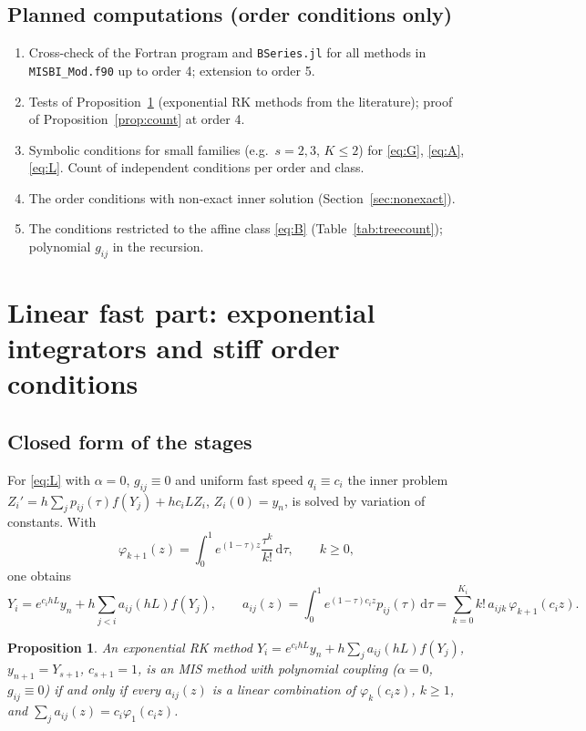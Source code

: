 \documentclass[11pt,a4paper]{article}
\newtheorem{proposition}[theorem]{Proposition}
\theoremstyle{definition}
\theoremstyle{remark}
\newcommand{\dd}{\,\mathrm{d}}
\begin{document}
\subsection{Planned computations (order conditions only)}

\begin{enumerate}
\item Cross-check of the Fortran program and \texttt{BSeries.jl} for all
  methods in \texttt{MISBI\_Mod.f90} up to order 4; extension to order 5.
\item Tests of Proposition~\ref{prop:exprk} (exponential RK methods from
  the literature); proof of Proposition~\ref{prop:count} at order 4.
\item Symbolic conditions for small families (e.g.\ $s=2,3$, $K\le2$)
  for \eqref{eq:G}, \eqref{eq:A}, \eqref{eq:L}. Count of independent
  conditions per order and class.
\item The order conditions with non-exact inner solution
  (Section~\ref{sec:nonexact}).
\item The conditions restricted to the affine class \eqref{eq:B}
  (Table~\ref{tab:treecount}); polynomial $g_{ij}$ in the recursion.
\end{enumerate}

\section{Linear fast part: exponential integrators and stiff order conditions}
\label{sec:exponential}

\subsection{Closed form of the stages}

For \eqref{eq:L} with $\alpha=0$, $g_{ij}\equiv0$ and uniform fast speed $q_i\equiv
c_i$ the inner problem
$Z_i'=h\sum_jp_{ij}(\tau)f(Y_j)+hc_iLZ_i$, $Z_i(0)=y_n$, is solved by
variation of constants. With
\begin{equation*}
 \varphi_{k+1}(z)=\int_0^1e^{(1-\tau)z}\frac{\tau^k}{k!}\dd\tau,\qquad k\ge0,
\end{equation*}
one obtains
\begin{equation}\label{eq:exprk}
 Y_i=e^{c_ihL}y_n+h\sum_{j<i}a_{ij}(hL)f(Y_j),\qquad
 a_{ij}(z)=\int_0^1e^{(1-\tau)c_iz}p_{ij}(\tau)\dd\tau
 =\sum_{k=0}^{K_i}k!\,a_{ijk}\,\varphi_{k+1}(c_iz).
\end{equation}

\begin{proposition}\label{prop:exprk}
An exponential RK method
$Y_i=e^{c_ihL}y_n+h\sum_ja_{ij}(hL)f(Y_j)$, $y_{n+1}=Y_{s+1}$, $c_{s+1}=1$,
is an MIS method with polynomial coupling ($\alpha=0$, $g_{ij}\equiv0$) if and only
if every $a_{ij}(z)$ is a linear combination of $\varphi_k(c_iz)$,
$k\ge1$, and $\sum_ja_{ij}(z)=c_i\varphi_1(c_iz)$.
\end{proposition}
\end{document}
